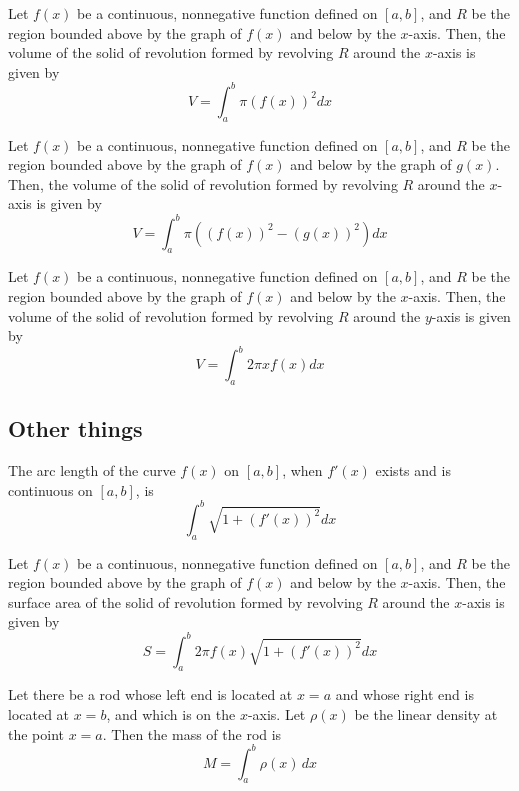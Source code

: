 \begin{theorem} Let $f(x)$ be a continuous, nonnegative function defined on $[a, b]$, and $R$ be the region bounded above by the graph of $f(x)$ and below by the $x$-axis. Then, the volume of the solid of revolution formed by revolving $R$ around the $x$-axis is given by
  \[
    V = \int_a^b \pi (f(x))^2 dx
  \]
\end{theorem}

\begin{theorem} Let $f(x)$ be a continuous, nonnegative function defined on $[a, b]$, and $R$ be the region bounded above by the graph of $f(x)$ and below by the graph of $g(x)$. Then, the volume of the solid of revolution formed by revolving $R$ around the $x$-axis is given by
  \[
    V = \int_a^b \pi ((f(x))^2 - (g(x))^2) dx
  \]
\end{theorem}

\begin{theorem} Let $f(x)$ be a continuous, nonnegative function defined on $[a, b]$, and $R$ be the region bounded above by the graph of $f(x)$ and below by the $x$-axis. Then, the volume of the solid of revolution formed by revolving $R$ around the $y$-axis is given by
  \[
    V = \int_a^b 2\pi x f(x) dx
  \]
\end{theorem}

\subsection*{Other things}

\begin{theorem}
  The arc length of the curve $f(x)$ on $[a, b]$, when $f'(x)$ exists and is continuous on $[a, b]$, is
  \[
    \int_a^b \sqrt{1 + \left(f'(x)\right)^2} dx
  \]
\end{theorem}

\begin{theorem}
  Let $f(x)$ be a continuous, nonnegative function defined on $[a, b]$, and $R$ be the region bounded above by the graph of $f(x)$ and below by the $x$-axis. Then, the surface area of the solid of revolution formed by revolving $R$ around the $x$-axis is given by
  \[
    S = \int_a^b 2\pi f(x) \sqrt{1 + \left(f'(x)\right)^2} dx
  \]
\end{theorem}

\begin{theorem}
  Let there be a rod whose left end is located at $x = a$ and whose right end is located at $x = b$, and which is on the $x$-axis. Let $\rho(x)$ be the linear density at the point $x = a$. Then the mass of the rod is
  \[
    M = \int_a^b \rho(x) \,dx
  \]
\end{theorem}

